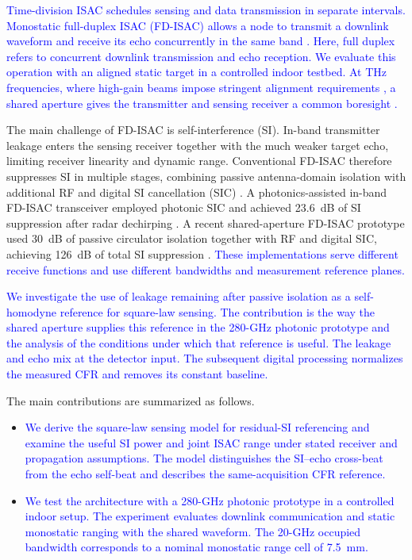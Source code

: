 \documentclass[10pt,journal]{IEEEtran}
\DeclareRobustCommand{\rev}[1]{\textcolor{blue}{#1}}
\begin{document}
\rev{Time-division ISAC schedules sensing and data transmission in separate
intervals. Monostatic full-duplex ISAC (FD-ISAC) allows a node to transmit
a downlink waveform and receive its echo concurrently in the same band
\cite{zhang_inband_2022,duan_frequencydomain_2024,duan_inband_2025,
zhang_cochannel_2026,du_fullduplexbased_2026,du_fullduplex_2026}.
Here, full duplex refers to concurrent downlink transmission and echo
reception. We evaluate this operation with an aligned static target in
a controlled indoor testbed. At THz frequencies, where high-gain beams
impose stringent alignment requirements \cite{sung_practical_2026},
a shared aperture gives the transmitter and sensing receiver a common
boresight \cite{wu_integrated_2025}.}

The main challenge of FD-ISAC is self-interference (SI). In-band
transmitter leakage enters the sensing receiver together with the much
weaker target echo, limiting receiver linearity and dynamic range.
Conventional FD-ISAC therefore suppresses SI in multiple stages,
combining passive antenna-domain isolation with additional RF and digital
SI cancellation (SIC)
\cite{duan_inband_2025,
du_fullduplexbased_2026,du_fullduplex_2026}.
A photonics-assisted in-band FD-ISAC transceiver employed photonic SIC and
achieved 23.6~dB of SI suppression after radar dechirping
\cite{yu_photonicsassisted_2024a}. A recent shared-aperture FD-ISAC
prototype used 30~dB of passive circulator isolation together with RF
and digital SIC, achieving 126~dB of total SI suppression
\cite{du_fullduplex_2026}. \rev{These implementations serve different receive functions and use
different bandwidths and measurement reference planes.}

\rev{We investigate the use of leakage remaining after passive isolation
as a self-homodyne reference for square-law sensing. The contribution
is the way the shared aperture supplies this reference in the 280-GHz
photonic prototype and the analysis of the conditions under which
that reference is useful. The leakage and echo mix at the detector
input. The subsequent digital processing normalizes the measured
CFR and removes its constant baseline.}

The main contributions are summarized as follows.
\begin{itemize}

\item \rev{We derive the square-law sensing model for residual-SI referencing
and examine the useful SI power and joint ISAC range under stated
receiver and propagation assumptions. The model distinguishes the
SI--echo cross-beat from the echo self-beat and describes the
same-acquisition CFR reference.}

\item \rev{We test the architecture with a 280-GHz photonic prototype in a
controlled indoor setup. The experiment evaluates downlink
communication and static monostatic ranging with the shared
waveform. The 20-GHz occupied bandwidth corresponds to a nominal
monostatic range cell of 7.5~mm.}

\end{itemize}
\end{document}
